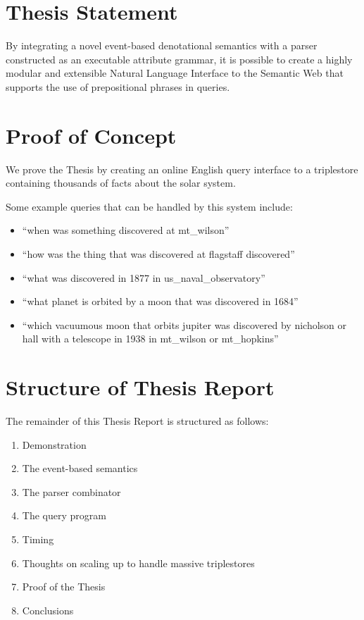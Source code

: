 \documentclass[../main.tex]{subfiles}
\begin{document}
\section{Thesis Statement}
By integrating a novel event-based denotational semantics with a parser constructed as an executable attribute grammar, it is possible to create a highly modular and extensible Natural Language Interface to the Semantic Web that supports the use of prepositional phrases in queries.

\section{Proof of Concept} We prove the Thesis by creating an online English query interface to a triplestore containing thousands of facts about the solar system\cite{Solarman:2016}.

Some example queries that can be handled by this system include:

\begin{itemize}
	\item ``when was something discovered at mt\_wilson''
	\item ``how was the thing that was discovered at flagstaff discovered''
	\item ``what was discovered in 1877 in us\_naval\_observatory''
	\item ``what planet is orbited by a moon that was discovered in 1684''
	\item ``which vacuumous moon that orbits jupiter was discovered by nicholson or hall with a telescope in 1938 in mt\_wilson or mt\_hopkins''
\end{itemize}

\section{Structure of Thesis Report}

The remainder of this Thesis Report is structured as follows:

\begin{enumerate}
	\item Demonstration
	\item The event-based semantics
	\item The parser combinator
	\item The query program
	\item Timing
	\item Thoughts on scaling up to handle massive triplestores
	\item Proof of the Thesis
	\item Conclusions
\end{enumerate}
\end{document}
